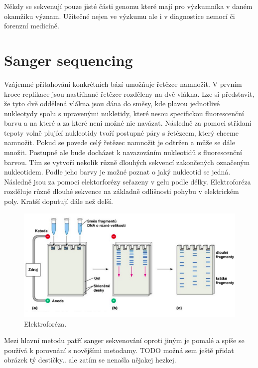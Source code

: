 \documentclass[czech,DP]{thesiskiv}
\begin{document}
Někdy se sekvenují pouze jisté části genomu které mají pro výzkumníka v daném okamžiku význam.
Užitečné nejen ve výzkumu ale i v diagnostice nemocí či forenzní medicíně.
\\
\section{Sanger sequencing}
Vzájemné přitahování konkrétních bází umožňuje řetězce namnožit. V prvním kroce replikace jsou nastříhané řetězce rozděleny na dvě vlákna. Lze si představit, že tyto dvě oddělená vlákna jsou dána do směsy, kde plavou jednotlivé nukleotydy spolu s upravenými nukletidy, které nesou specifickou fluorescenční barvu a na které a za které neni možné nic navázat. Následně za pomoci střídaní tepoty volně plující nukleotidy tvoří postupné páry s řetězcem, který chceme namnožit. Pokud se povede celý řetězec namnožit je odtržen a může se dále množit. Postupně ale bude docházet k navazováním nukleotidů s fluorescenční barvou. Tím se vytvoří nekolik různě dlouhých sekvencí zakončených označeným nukleotidem. Podle jeho barvy je možné poznat o jaký nukleotid se jedná. Následně jsou za pomoci elektorforézy seřazeny v gelu podle délky. Elektroforéza rozděluje různě dlouhé sekvence na základně odlišnosti pohybu v elektrickém poly. Kratší doputují dále než delší.     

\begin{figure}[H]		
		\centering
		\includegraphics[width=\textwidth]{./img/elektroforeza.png}
		\caption{Elektroforéza. \cite{elektroforeza_img}}
		\label{fig:elektroforeza}
\end{figure}



 Mezi hlavní metodu patří sanger sekvenování oproti jiným je pomalé a spíše se používá k porovnání s novějšími metodamy. 
TODO možná sem ještě přidat obrázek tý destičky.. ale zatím se nenašla nějakej hezkej.
 
\end{document}
